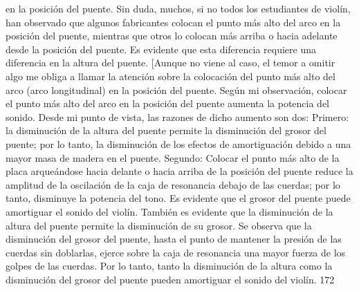 en la posición del puente. Sin duda, muchos, si no todos los estudiantes de violín, han observado que algunos fabricantes colocan el punto más alto del arco en la posición del puente, mientras que otros lo colocan más arriba o hacia adelante desde la posición del puente. Es evidente que esta diferencia requiere una diferencia en la altura del puente. [Aunque no viene al caso, el temor a omitir algo me obliga a llamar la atención sobre la colocación del punto más alto del arco (arco longitudinal) en la posición del puente. Según mi observación, colocar el punto más alto del arco en la posición del puente aumenta la potencia del sonido. Desde mi punto de vista, las razones de dicho aumento son dos: Primero: la disminución de la altura del puente permite la disminución del grosor del puente; por lo tanto, la disminución de los efectos de amortiguación debido a una mayor masa de madera en el puente. Segundo:
Colocar el punto más alto de la placa arqueándose hacia delante o hacia arriba de la posición del puente reduce la amplitud de la oscilación de la caja de resonancia debajo de las cuerdas; por lo tanto, disminuye la potencia del tono.
Es evidente que el grosor del puente puede amortiguar el sonido del violín. También es evidente que la disminución de la altura del puente permite la disminución de su grosor. Se observa que la disminución del grosor del puente, hasta el punto de mantener la presión de las cuerdas sin doblarlas, ejerce sobre la caja de resonancia una mayor fuerza de los golpes de las cuerdas. Por lo tanto, tanto la disminución de la altura como la disminución del grosor del puente pueden amortiguar el sonido del violín.
172

